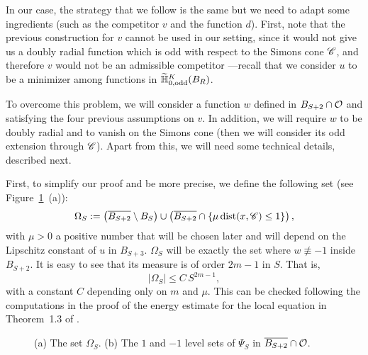 In our case, the strategy that we follow is the same but we need to adapt some ingredients (such as the competitor $v$ and the function $d$). First, note that the previous construction for $v$ cannot be used in our setting, since it would not give us a doubly radial function which is odd with respect to the Simons cone $\mathscr{C}$, and therefore $v$ would not be an admissible competitor ---recall that we consider $u$ to be a minimizer among functions in $\widetilde{\mathbb{H}}^K_{0, \mathrm{odd}}(B_R)$. 

To overcome this problem, we will consider a function $w$ defined in $B_{S+2}\cap \mathcal{O}$ and satisfying the four previous assumptions on $v$. In addition, we will require $w$ to be doubly radial and to vanish on the Simons cone (then we will consider its odd extension through $\mathscr{C}$). Apart from this, we will need some technical details, described next. 

First, to simplify our proof and be more precise, we define the following set (see Figure~\ref{Fig:PsiSandOmegaS}~(a)):
\begin{equation}
\label{Eq:DefOmegaS}
\Omega_S := \left( \overline{B_{S+2}}\setminus B_S \right) \cup \left(  \overline{B_{S+2}} \cap \{\mu \operatorname{dist}(x,\mathscr{C}) \leq 1\}\right),
\end{equation} 
with $\mu>0$ a positive number that will be chosen later and will depend on the Lipschitz constant of $u$ in $B_{S+3}$. $\Omega_S$ will be exactly the set where $w\not \equiv -1$ inside $B_{S+2}$. It is easy to see that its measure is of order $2m-1$ in $S$. That is,
 \begin{equation}
 \label{Eq:MeasureOmegaS}
 |\Omega_S| \leq C\,S^{2m-1},
 \end{equation}
with a constant $C$ depending only on $m$ and $\mu$. This can be checked following the computations in the proof of the energy estimate for the local equation in Theorem~1.3 of \cite{CabreTerraI}.

\begin{figure}
	\centering
	  \hspace{-0.26\textwidth} 
	\begin{subfigure}{0.21\textwidth}
		\centering
		
	\end{subfigure}
	  \hspace{0.28\textwidth} 
	\begin{subfigure}{0.21\textwidth}
		\centering		
		
	\end{subfigure}
	\caption{(a) The set $\Omega_S$. (b) The $1$ and $-1$ level sets of $\Psi_S$ in $\overline{B_{S+2}}\cap \mathcal{O}$.}
	\label{Fig:PsiSandOmegaS}
\end{figure}



